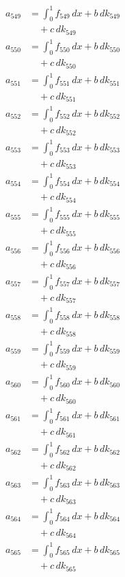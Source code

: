 \documentclass{article}
\begin{document}
\begin{align}
a_{549} &= \int_0^1 f_{549}\,dx + b\,dk_{549} \\
&\quad + c\,dk_{549} \\
a_{550} &= \int_0^1 f_{550}\,dx + b\,dk_{550} \\
&\quad + c\,dk_{550} \\
a_{551} &= \int_0^1 f_{551}\,dx + b\,dk_{551} \\
&\quad + c\,dk_{551} \\
a_{552} &= \int_0^1 f_{552}\,dx + b\,dk_{552} \\
&\quad + c\,dk_{552} \\
a_{553} &= \int_0^1 f_{553}\,dx + b\,dk_{553} \\
&\quad + c\,dk_{553} \\
a_{554} &= \int_0^1 f_{554}\,dx + b\,dk_{554} \\
&\quad + c\,dk_{554} \\
a_{555} &= \int_0^1 f_{555}\,dx + b\,dk_{555} \\
&\quad + c\,dk_{555} \\
a_{556} &= \int_0^1 f_{556}\,dx + b\,dk_{556} \\
&\quad + c\,dk_{556} \\
a_{557} &= \int_0^1 f_{557}\,dx + b\,dk_{557} \\
&\quad + c\,dk_{557} \\
a_{558} &= \int_0^1 f_{558}\,dx + b\,dk_{558} \\
&\quad + c\,dk_{558} \\
a_{559} &= \int_0^1 f_{559}\,dx + b\,dk_{559} \\
&\quad + c\,dk_{559} \\
a_{560} &= \int_0^1 f_{560}\,dx + b\,dk_{560} \\
&\quad + c\,dk_{560} \\
a_{561} &= \int_0^1 f_{561}\,dx + b\,dk_{561} \\
&\quad + c\,dk_{561} \\
a_{562} &= \int_0^1 f_{562}\,dx + b\,dk_{562} \\
&\quad + c\,dk_{562} \\
a_{563} &= \int_0^1 f_{563}\,dx + b\,dk_{563} \\
&\quad + c\,dk_{563} \\
a_{564} &= \int_0^1 f_{564}\,dx + b\,dk_{564} \\
&\quad + c\,dk_{564} \\
a_{565} &= \int_0^1 f_{565}\,dx + b\,dk_{565} \\
&\quad + c\,dk_{565} \\

\end{align}
\end{document}
